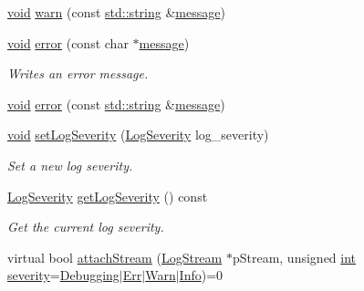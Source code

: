 \begin{DoxyCompactItemize}
\hyperlink{_s_d_l__opengl_8h_a3db05964a3cc4410f35b7ea2b7eb850d}{void} \hyperlink{class_assimp_1_1_logger_afe0f9914014c7a62780a67557b9fc0d3}{warn} (const \hyperlink{_s_d_l__opengl_8h_a4643b88e2349494c65861169f8944eca}{std\-::string} \&\hyperlink{_g_l_e_w_2glew_8h_ab5d4c2bfcb78f279c688575297d42f74}{message})
\item 
\hyperlink{_s_d_l__opengl_8h_a3db05964a3cc4410f35b7ea2b7eb850d}{void} \hyperlink{class_assimp_1_1_logger_aa8b7c3f56dc4cecfdacc8bb36ba3fac1}{error} (const char $\ast$\hyperlink{_g_l_e_w_2glew_8h_ab5d4c2bfcb78f279c688575297d42f74}{message})
\begin{DoxyCompactList}\small\item\em Writes an error message. \end{DoxyCompactList}\item 
\hyperlink{_s_d_l__opengl_8h_a3db05964a3cc4410f35b7ea2b7eb850d}{void} \hyperlink{class_assimp_1_1_logger_a42b564d43664bb9fdc72613aa3e54770}{error} (const \hyperlink{_s_d_l__opengl_8h_a4643b88e2349494c65861169f8944eca}{std\-::string} \&\hyperlink{_g_l_e_w_2glew_8h_ab5d4c2bfcb78f279c688575297d42f74}{message})
\item 
\hyperlink{_s_d_l__opengl_8h_a3db05964a3cc4410f35b7ea2b7eb850d}{void} \hyperlink{class_assimp_1_1_logger_a8fb4fa4c2c329a36ac39bc9c743925f1}{set\-Log\-Severity} (\hyperlink{class_assimp_1_1_logger_a8b6248a0fd062431e8572556350d29e6}{Log\-Severity} log\-\_\-severity)
\begin{DoxyCompactList}\small\item\em Set a new log severity. \end{DoxyCompactList}\item 
\hyperlink{class_assimp_1_1_logger_a8b6248a0fd062431e8572556350d29e6}{Log\-Severity} \hyperlink{class_assimp_1_1_logger_a2b4cee0d7f1f8948308ab6a8ee1a3dc7}{get\-Log\-Severity} () const 
\begin{DoxyCompactList}\small\item\em Get the current log severity. \end{DoxyCompactList}\item 
virtual bool \hyperlink{class_assimp_1_1_logger_aaf32a42b02a7e227076013d01e349871}{attach\-Stream} (\hyperlink{class_assimp_1_1_log_stream}{Log\-Stream} $\ast$p\-Stream, unsigned \hyperlink{_s_d_l__thread_8h_a6a64f9be4433e4de6e2f2f548cf3c08e}{int} \hyperlink{_g_l_e_w_2glew_8h_aa9ef9fc6186ec914a859436da4764bca}{severity}=\hyperlink{class_assimp_1_1_logger_acd0b52a87d6fc11e957ed2c6e2ad75b6a0cb475014d27098c3423738c571d857f}{Debugging}$|$\hyperlink{class_assimp_1_1_logger_acd0b52a87d6fc11e957ed2c6e2ad75b6a71054d0b1323abcea46d050d69013d27}{Err}$|$\hyperlink{class_assimp_1_1_logger_acd0b52a87d6fc11e957ed2c6e2ad75b6a1279c77aaee5a3d7df835a9b9305a697}{Warn}$|$\hyperlink{class_assimp_1_1_logger_acd0b52a87d6fc11e957ed2c6e2ad75b6aa3377a574928b86f7de55c5df154f461}{Info})=0

\end{DoxyCompactItemize}

